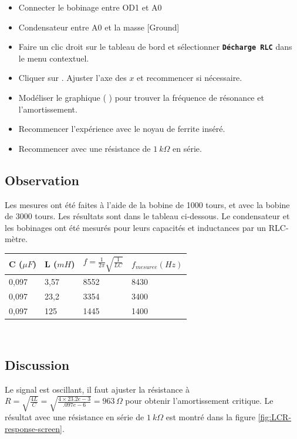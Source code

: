 \documentclass{book}
\newcommand{\nop}{}
\begin{document}
\begin{itemize}
  \item Connecter le bobinage entre OD1 et A0
  \item Condensateur entre A0 et la masse [Ground]
  \item Faire un clic droit sur le tableau de bord et sélectionner  \texttt{\textbf{Décharge RLC}\nop} dans le menu contextuel.
  \item Cliquer sur  . Ajuster l'axe des $x$ et recommencer si nécessaire.
  \item Modéliser le graphique ( ) pour trouver la fréquence de résonance et l'amortissement.
  \item Recommencer l'expérience avec le noyau de ferrite inséré.
  \item Recommencer avec une résistance de $1\ k\Omega$  en série.
\end{itemize}

\subsection{Observation}


Les mesures ont été faites à l'aide de la bobine de 1000 tours, et avec la bobine de 3000 tours. Les résultats sont dans le tableau ci-dessous. Le condensateur et les bobinages ont été mesurés pour leurs capacités et inductances par un RLC-mètre.



\begin{tabular}{|l|l|l|l|}
\hline
C ($\mu F$)&L ($mH$)&$f=\frac{1}{2\pi}\sqrt{\frac{1}{LC} }$&$f_{mesuree}(Hz)$
\\ \hline
0,097&3,57&8552&8430
\\ \hline
0,097&23,2&3354&3400
\\ \hline
0,097&125&1445&1400
\\ \hline
\end{tabular}\\[0.5em]

\subsection{Discussion}


Le signal est oscillant, il faut ajuster la résistance à $R=\sqrt{\frac{4L}{C} }=\sqrt{\frac{4\times23.2e-3}{.097e-6} }=963\,\Omega$  pour obtenir l'amortissement critique. Le résultat avec une résistance en série de $1\ k\Omega$  est montré dans la figure  \ref{fig:LCR-response-screen}.
\end{document}

